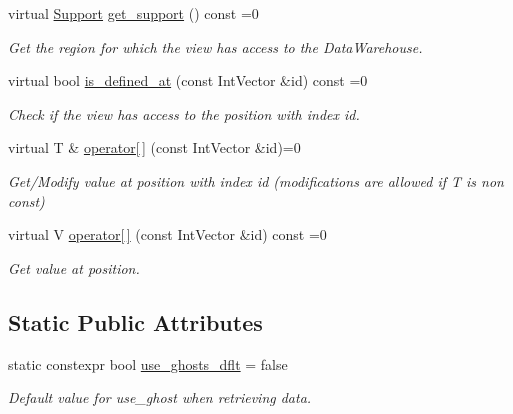 \begin{DoxyCompactItemize}
virtual \hyperlink{classUintah_1_1PhaseField_1_1Support}{Support} \hyperlink{classUintah_1_1PhaseField_1_1detail_1_1view_3_01ScalarField_3_01T_01_4_01_4_a3e14b0c7a57a57707bb33954861ab1c1}{get\+\_\+support} () const =0
\begin{DoxyCompactList}\small\item\em Get the region for which the view has access to the Data\+Warehouse. \end{DoxyCompactList}\item 
virtual bool \hyperlink{classUintah_1_1PhaseField_1_1detail_1_1view_3_01ScalarField_3_01T_01_4_01_4_a9a950513dacd6468658436b737c3314f}{is\+\_\+defined\+\_\+at} (const Int\+Vector \&id) const =0
\begin{DoxyCompactList}\small\item\em Check if the view has access to the position with index id. \end{DoxyCompactList}\item 
virtual T \& \hyperlink{classUintah_1_1PhaseField_1_1detail_1_1view_3_01ScalarField_3_01T_01_4_01_4_a96b3035d435ae901516b6bc5e138f3b5}{operator\mbox{[}$\,$\mbox{]}} (const Int\+Vector \&id)=0
\begin{DoxyCompactList}\small\item\em Get/\+Modify value at position with index id (modifications are allowed if T is non const) \end{DoxyCompactList}\item 
virtual V \hyperlink{classUintah_1_1PhaseField_1_1detail_1_1view_3_01ScalarField_3_01T_01_4_01_4_aea43cfedfe3b6f3c038ff795caec49b8}{operator\mbox{[}$\,$\mbox{]}} (const Int\+Vector \&id) const =0
\begin{DoxyCompactList}\small\item\em Get value at position. \end{DoxyCompactList}\end{DoxyCompactItemize}
\subsection*{Static Public Attributes}
\begin{DoxyCompactItemize}
\item 
static constexpr bool \hyperlink{classUintah_1_1PhaseField_1_1detail_1_1view_3_01ScalarField_3_01T_01_4_01_4_aab1ca433909d91301560b00feb645d8b}{use\+\_\+ghosts\+\_\+dflt} = false
\begin{DoxyCompactList}\small\item\em Default value for use\+\_\+ghost when retrieving data. \end{DoxyCompactList}\end{DoxyCompactItemize}


